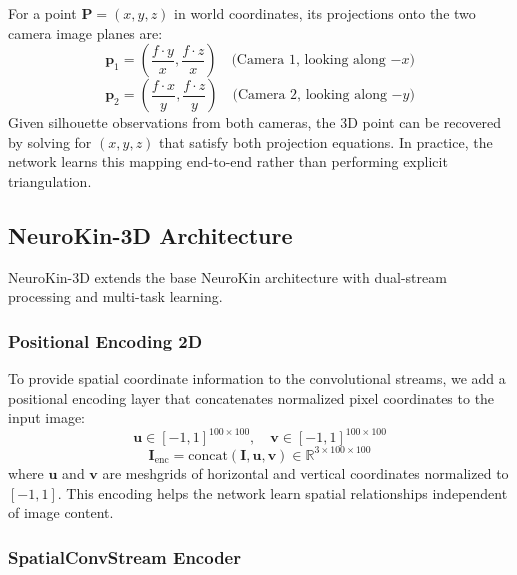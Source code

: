 \documentclass[12pt,a4paper,oneside]{report}
\begin{document}
For a point $\mathbf{P} = (x, y, z)$ in world coordinates, its projections onto the two camera image planes are:
\begin{equation}
\mathbf{p}_1 = \left( \frac{f \cdot y}{x}, \frac{f \cdot z}{x} \right) \quad \text{(Camera 1, looking along $-x$)}
\end{equation}
\begin{equation}
\mathbf{p}_2 = \left( \frac{f \cdot x}{y}, \frac{f \cdot z}{y} \right) \quad \text{(Camera 2, looking along $-y$)}
\end{equation}
Given silhouette observations from both cameras, the 3D point can be recovered by solving for $(x, y, z)$ that satisfy both projection equations. In practice, the network learns this mapping end-to-end rather than performing explicit triangulation.

\subsection{NeuroKin-3D Architecture}

NeuroKin-3D extends the base NeuroKin architecture with dual-stream processing and multi-task learning.

\subsubsection{Positional Encoding 2D}

To provide spatial coordinate information to the convolutional streams, we add a positional encoding layer that concatenates normalized pixel coordinates to the input image:
\begin{equation}
\mathbf{u} \in [-1, 1]^{100 \times 100}, \quad \mathbf{v} \in [-1, 1]^{100 \times 100}
\end{equation}
\begin{equation}
\mathbf{I}_{\text{enc}} = \text{concat}(\mathbf{I}, \mathbf{u}, \mathbf{v}) \in \mathbb{R}^{3 \times 100 \times 100}
\end{equation}
where $\mathbf{u}$ and $\mathbf{v}$ are meshgrids of horizontal and vertical coordinates normalized to $[-1, 1]$. This encoding helps the network learn spatial relationships independent of image content.

\subsubsection{SpatialConvStream Encoder}
\end{document}
